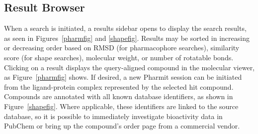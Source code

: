 \subsection{Result Browser}
When a search is initiated, a results sidebar opens to display the search results, as seen in Figures~\ref{pharmfig} and \ref{shapefig}. Results may be sorted in increasing or decreasing order based on RMSD (for pharmacophore searches), similarity score (for shape searches), molecular weight, or number of rotatable bonds. Clicking on a result displays the query-aligned compound in the molecular viewer, as Figure~\ref{pharmfig} shows.  If desired, a new Pharmit session can be initiated from the ligand-protein complex represented by the selected hit compound.
Compounds are annotated with all known database identifiers, as shown in Figure~\ref{shapefig}. Where applicable, these identifiers are linked to the source database, so it is possible to immediately investigate bioactivity data in PubChem or bring up the compound's order page from a commercial vendor.